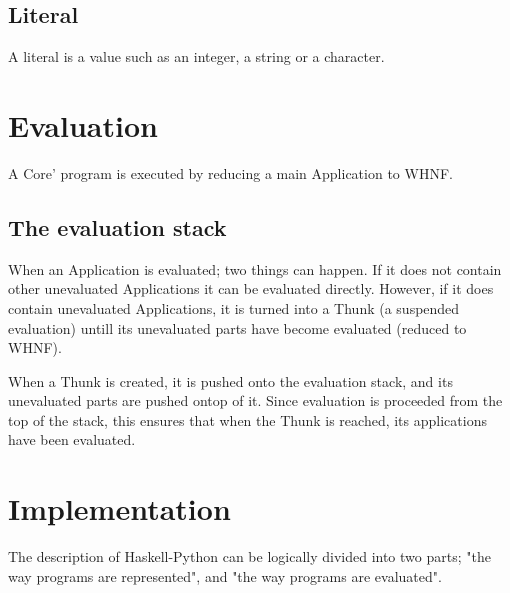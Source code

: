 \subsection{Literal}
A literal is a value such as an integer, a string or a character.


\section{Evaluation}

A Core' program is executed by reducing a main Application to WHNF.

\subsection{The evaluation stack}

When an Application is evaluated; two things can happen. If it does not contain
other unevaluated Applications it can be evaluated directly. However, if it does
contain unevaluated Applications, it is turned into a Thunk (a suspended evaluation)
untill its unevaluated parts have become evaluated (reduced to WHNF).

When a Thunk is created, it is pushed onto the evaluation stack, and its 
unevaluated parts are pushed ontop of it. Since evaluation is proceeded from the
top of the stack, this ensures that when the Thunk is reached, its applications
have been evaluated.






\section{Implementation}

The description of Haskell-Python can be 
logically divided into two parts; "the way programs are 
represented", and "the way programs are evaluated".


